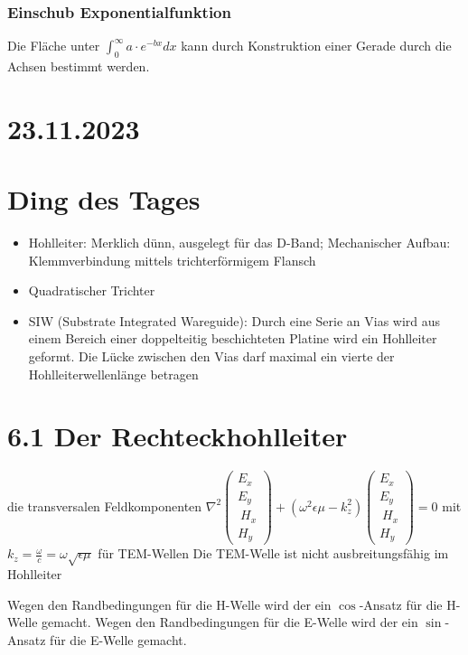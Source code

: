 \documentclass[a4paper]{article}
\begin{document}
\subsubsection*{Einschub Exponentialfunktion}
Die Fläche unter $\int_{0}^{\infty}   a\cdot e^{-bx} dx$ kann durch Konstruktion einer Gerade durch die Achsen bestimmt werden.

\section*{23.11.2023}
\section*{Ding des Tages}
\begin{itemize}
    \item Hohlleiter: Merklich dünn, ausgelegt für das D-Band; Mechanischer Aufbau: Klemmverbindung mittels trichterförmigem Flansch
    \item Quadratischer Trichter
    \item SIW (Substrate Integrated Wareguide): Durch eine Serie an Vias wird aus einem Bereich einer doppelteitig beschichteten Platine wird ein Hohlleiter geformt. Die Lücke zwischen den Vias darf maximal ein vierte der Hohlleiterwellenlänge betragen
\end{itemize}

\section*{6.1 Der Rechteckhohlleiter}
die transversalen Feldkomponenten
$\nabla^{2} \begin{pmatrix} E_{x}\\ E_{y}\\\ H_{x}\\ H_{y}\end{pmatrix}
+(\omega^{2}\epsilon\mu-k_{z}^{2})
\begin{pmatrix} E_{x}\\ E_{y}\\\ H_{x}\\ H_{y}\end{pmatrix}=0$
mit $k_{z}=\frac{\omega}{c}=\omega\sqrt{\epsilon\mu} $ für TEM-Wellen
\implies Die TEM-Welle ist nicht ausbreitungsfähig im Hohlleiter

Wegen den Randbedingungen für die H-Welle wird der ein $\cos$-Ansatz für die H-Welle gemacht.
Wegen den Randbedingungen für die E-Welle wird der ein $\sin$-Ansatz für die E-Welle gemacht.
\end{document}
